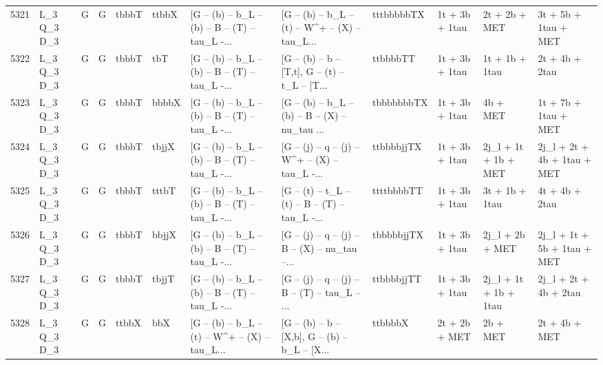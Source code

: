 \begin{tabular}{llllllllllll}
5321 &  L\_3 Q\_3 D\_3 &     G &     G &       tbbbT &       ttbbX &  [G -- (b) -- b\_L -- (b) -- B -- (T) -- tau\_L -... &  [G -- (b) -- b\_L -- (t) -- W\textasciicircum + -- (X) -- tau\_L... &  tttbbbbbTX &           1t + 3b + 1tau &            2t + 2b + MET &               3t + 5b + 1tau + MET \\
5322 &  L\_3 Q\_3 D\_3 &     G &     G &       tbbbT &         tbT &  [G -- (b) -- b\_L -- (b) -- B -- (T) -- tau\_L -... &  [G -- (b) -- b -- [T,t], G -- (t) -- t\_L -- [T... &    ttbbbbTT &           1t + 3b + 1tau &           1t + 1b + 1tau &                     2t + 4b + 2tau \\
5323 &  L\_3 Q\_3 D\_3 &     G &     G &       tbbbT &       bbbbX &  [G -- (b) -- b\_L -- (b) -- B -- (T) -- tau\_L -... &  [G -- (b) -- b\_L -- (b) -- B -- (X) -- nu\_tau ... &  tbbbbbbbTX &           1t + 3b + 1tau &                 4b + MET &               1t + 7b + 1tau + MET \\
5324 &  L\_3 Q\_3 D\_3 &     G &     G &       tbbbT &       tbjjX &  [G -- (b) -- b\_L -- (b) -- B -- (T) -- tau\_L -... &  [G -- (j) -- q -- (j) -- W\textasciicircum + -- (X) -- tau\_L -... &  ttbbbbjjTX &           1t + 3b + 1tau &     2j\_l + 1t + 1b + MET &        2j\_l + 2t + 4b + 1tau + MET \\
5325 &  L\_3 Q\_3 D\_3 &     G &     G &       tbbbT &       tttbT &  [G -- (b) -- b\_L -- (b) -- B -- (T) -- tau\_L -... &  [G -- (t) -- t\_L -- (t) -- B -- (T) -- tau\_L -... &  ttttbbbbTT &           1t + 3b + 1tau &           3t + 1b + 1tau &                     4t + 4b + 2tau \\
5326 &  L\_3 Q\_3 D\_3 &     G &     G &       tbbbT &       bbjjX &  [G -- (b) -- b\_L -- (b) -- B -- (T) -- tau\_L -... &  [G -- (j) -- q -- (j) -- B -- (X) -- nu\_tau --... &  tbbbbbjjTX &           1t + 3b + 1tau &          2j\_l + 2b + MET &        2j\_l + 1t + 5b + 1tau + MET \\
5327 &  L\_3 Q\_3 D\_3 &     G &     G &       tbbbT &       tbjjT &  [G -- (b) -- b\_L -- (b) -- B -- (T) -- tau\_L -... &  [G -- (j) -- q -- (j) -- B -- (T) -- tau\_L -- ... &  ttbbbbjjTT &           1t + 3b + 1tau &    2j\_l + 1t + 1b + 1tau &              2j\_l + 2t + 4b + 2tau \\
5328 &  L\_3 Q\_3 D\_3 &     G &     G &       ttbbX &         bbX &  [G -- (b) -- b\_L -- (t) -- W\textasciicircum + -- (X) -- tau\_L... &  [G -- (b) -- b -- [X,b], G -- (b) -- b\_L -- [X... &     ttbbbbX &            2t + 2b + MET &                 2b + MET &                      2t + 4b + MET \\

\end{tabular}
